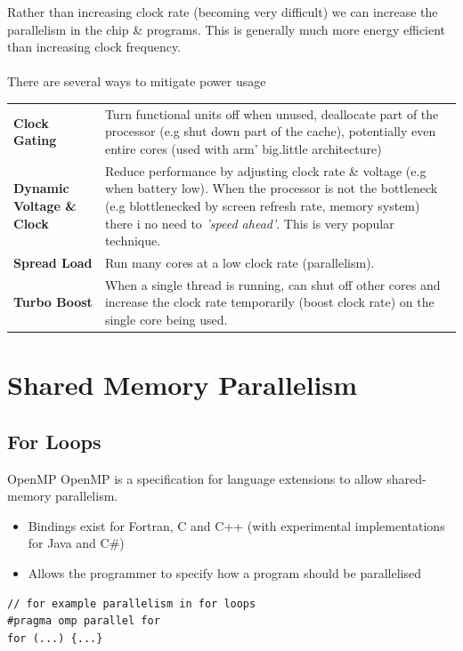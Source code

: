 Rather than increasing clock rate (becoming very difficult) we can increase the parallelism in the chip \& programs. This is generally much more energy efficient than increasing clock frequency.
\\
\\ There are several ways to mitigate power usage
\begin{center}
	\begin{tabular}{p{} p{}}
		\textbf{Clock Gating}             & Turn functional units off when unused, deallocate part of the processor (e.g shut down part of the cache), potentially even entire cores (used with arm' big.little architecture)                                                                           \\
		\textbf{Dynamic Voltage \& Clock} & Reduce performance by adjusting clock rate \& voltage (e.g when battery low). When the processor is not the bottleneck (e.g blottlenecked by screen refresh rate, memory system) there i no need to \textit{'speed ahead'}. This is very popular technique. \\
		\textbf{Spread Load}              & Run many cores at a low clock rate (parallelism).                                                                                                                                                                                                           \\
		\textbf{Turbo Boost}              & When a single thread is running, can shut off other cores and increase the clock rate temporarily (boost clock rate) on the single core being used.                                                                                                         \\
	\end{tabular}
\end{center}

\section{Shared Memory Parallelism}
\subsection{For Loops}
\begin{definitionbox}{OpenMP}
	OpenMP is a specification for language extensions to allow shared-memory parallelism.
	\begin{itemize}
		\item Bindings exist for Fortran, C and C++ (with experimental implementations for Java and C\#)
		\item Allows the programmer to specify how a program should be parallelised
	\end{itemize}
	\begin{verbatim}
// for example parallelism in for loops
#pragma omp parallel for
for (...) {...}
    \end{verbatim}
\end{definitionbox}

